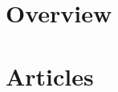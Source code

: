 \documentclass[12pt]{book} %
\begin{document}
\mainmatter
%
%
\part{Overview}
\label{part:1}



%
%



\part{Articles}
\label{part:2}
\begin{appendices}
\end{appendices}

\newpage
\listoffigures

\let\cleardoublepage\clearpage

\newpage
\lstlistoflistings

\let\cleardoublepage\clearpage

\newpage
\listoftables

\backmatter
\end{document}
